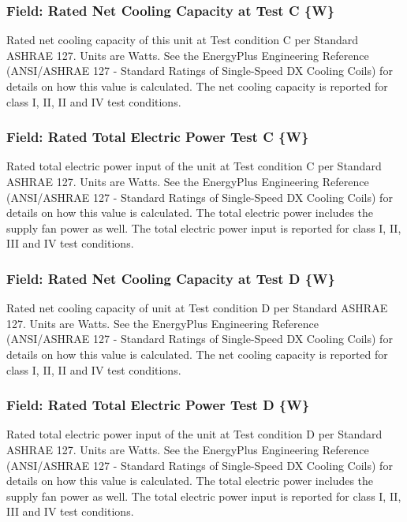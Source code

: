 \subsubsection{Field: Rated Net Cooling Capacity at Test C \{W\}}\label{field-rated-net-cooling-capacity-at-test-c-w}

Rated net cooling capacity of this unit at Test condition C per Standard ASHRAE 127. Units are Watts. See the EnergyPlus Engineering Reference (ANSI/ASHRAE 127 - Standard Ratings of Single-Speed DX Cooling Coils) for details on how this value is calculated. The net cooling capacity is reported for class I, II, II and IV test conditions.

\subsubsection{Field: Rated Total Electric Power Test C \{W\}}\label{field-rated-total-electric-power-test-c-w}

Rated total electric power input of the unit at Test condition C per Standard ASHRAE 127. Units are Watts. See the EnergyPlus Engineering Reference (ANSI/ASHRAE 127 - Standard Ratings of Single-Speed DX Cooling Coils) for details on how this value is calculated. The total electric power includes the supply fan power as well. The total electric power input is reported for class I, II, III and IV test conditions.

\subsubsection{Field: Rated Net Cooling Capacity at Test D \{W\}}\label{field-rated-net-cooling-capacity-at-test-d-w}

Rated net cooling capacity of unit at Test condition D per Standard ASHRAE 127. Units are Watts. See the EnergyPlus Engineering Reference (ANSI/ASHRAE 127 - Standard Ratings of Single-Speed DX Cooling Coils) for details on how this value is calculated. The net cooling capacity is reported for class I, II, II and IV test conditions.

\subsubsection{Field: Rated Total Electric Power Test D \{W\}}\label{field-rated-total-electric-power-test-d-w}

Rated total electric power input of the unit at Test condition D per Standard ASHRAE 127. Units are Watts. See the EnergyPlus Engineering Reference (ANSI/ASHRAE 127 - Standard Ratings of Single-Speed DX Cooling Coils) for details on how this value is calculated. The total electric power includes the supply fan power as well. The total electric power input is reported for class I, II, III and IV test conditions.


